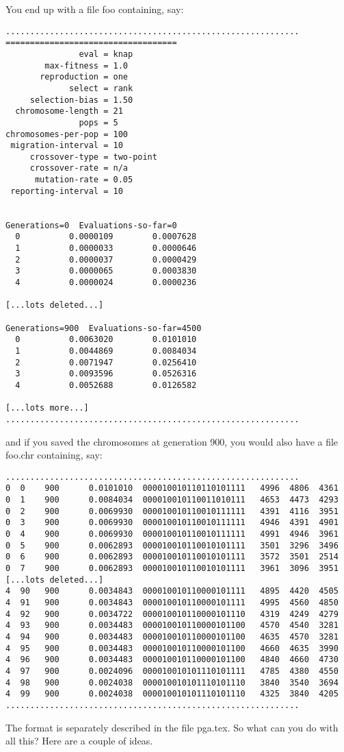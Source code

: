 You end up with a file foo containing, say:
\begin{verbatim}
............................................................
===================================
               eval = knap
        max-fitness = 1.0
       reproduction = one
             select = rank
     selection-bias = 1.50
  chromosome-length = 21
               pops = 5
chromosomes-per-pop = 100
 migration-interval = 10
     crossover-type = two-point
     crossover-rate = n/a
      mutation-rate = 0.05
 reporting-interval = 10


Generations=0  Evaluations-so-far=0
  0          0.0000109        0.0007628
  1          0.0000033        0.0000646
  2          0.0000037        0.0000429
  3          0.0000065        0.0003830
  4          0.0000024        0.0000236

[...lots deleted...]

Generations=900  Evaluations-so-far=4500
  0          0.0063020        0.0101010
  1          0.0044869        0.0084034
  2          0.0071947        0.0256410
  3          0.0093596        0.0526316
  4          0.0052688        0.0126582

[...lots more...]
............................................................
\end{verbatim}
and if you saved the chromosomes at generation 900, you would also
have a file foo.chr containing, say:
\begin{verbatim}
............................................................
0  0    900      0.0101010  000010010110110101111   4996  4806  4361
0  1    900      0.0084034  000010010110011010111   4653  4473  4293
0  2    900      0.0069930  000010010110010111111   4391  4116  3951
0  3    900      0.0069930  000010010110010111111   4946  4391  4901
0  4    900      0.0069930  000010010110010111111   4991  4946  3961
0  5    900      0.0062893  000010010110010101111   3501  3296  3496
0  6    900      0.0062893  000010010110010101111   3572  3501  2514
0  7    900      0.0062893  000010010110010101111   3961  3096  3951
[...lots deleted...]
4  90   900      0.0034843  000010010110000101111   4895  4420  4505
4  91   900      0.0034843  000010010110000101111   4995  4560  4850
4  92   900      0.0034722  000010010110000101110   4319  4249  4279
4  93   900      0.0034483  000010010110000101100   4570  4540  3281
4  94   900      0.0034483  000010010110000101100   4635  4570  3281
4  95   900      0.0034483  000010010110000101100   4660  4635  3990
4  96   900      0.0034483  000010010110000101100   4840  4660  4730
4  97   900      0.0024096  000010010101110101111   4785  4380  4550
4  98   900      0.0024038  000010010101110101110   3840  3540  3694
4  99   900      0.0024038  000010010101110101110   4325  3840  4205
............................................................
\end{verbatim}
The format is separately described in the file pga.tex.
So what can you do with all this? Here are a couple of ideas.

